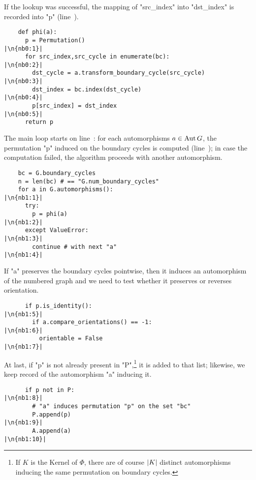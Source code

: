 If the lookup was successful, the mapping of "src_index" into
"dst_index" is recorded into "p" (line~).
\begin{lstlisting}
    def phi(a):
      p = Permutation()                                         |\n{nb0:1}|
      for src_index,src_cycle in enumerate(bc):                 |\n{nb0:2}|
        dst_cycle = a.transform_boundary_cycle(src_cycle)       |\n{nb0:3}|
        dst_index = bc.index(dst_cycle)                         |\n{nb0:4}|
        p[src_index] = dst_index                                |\n{nb0:5}|
      return p

\end{lstlisting}

The main loop starts on line~: for each automorphisms $a \in
\operatorname{Aut} G$, the permutation "p" induced on the boundary cycles is
computed (line~); in case the computation failed, the
algorithm proceeds with another automorphism.
\begin{lstlisting}
    bc = G.boundary_cycles
    n = len(bc) # == "G.num_boundary_cycles"
    for a in G.automorphisms():                                 |\n{nb1:1}|
      try:
        p = phi(a)                                              |\n{nb1:2}|
      except ValueError:                                        |\n{nb1:3}|
        continue # with next "a"                                |\n{nb1:4}|

\end{lstlisting}
If "a" preserves the boundary cycles pointwise, then it induces an
automorphism of the numbered graph and we need to test whether it
preserves or reverses orientation.
\begin{lstlisting}
      if p.is_identity():                                       |\n{nb1:5}|
        if a.compare_orientations() == -1:                      |\n{nb1:6}|
          orientable = False                                    |\n{nb1:7}|

\end{lstlisting}
At last, if "p" is not already present in "P",\footnote{If $K$ is the
  Kernel of $\Phi$, there are of course $\lvert K\rvert$ distinct
  automorphisms inducing the same permutation on boundary cycles.}  it
is added to that list; likewise, we keep record of the automorphism
"a" inducing it.
\begin{lstlisting}
      if p not in P:                                            |\n{nb1:8}|
        # "a" induces permutation "p" on the set "bc"           
        P.append(p)                                             |\n{nb1:9}|
        A.append(a)                                             |\n{nb1:10}|

\end{lstlisting}

